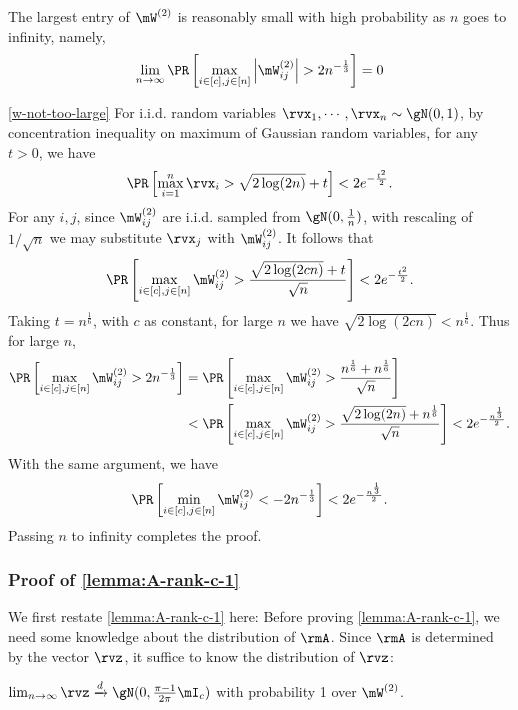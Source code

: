 \begin{lemma}
\label{w-not-too-large}
The largest entry of $\mW^{(2)}$ is reasonably small with high probability as $n$ goes to infinity, namely,
\begin{equation}
\lim_{n\to\infty}\PR\left[\max_{i\in[c],j\in[n]}\left|\mW^{(2)}_{ij}\right\vert > 2n^{-\frac13}\right] = 0
\end{equation}
\end{lemma}

\begin{proofof}{\cref{w-not-too-large}}
For i.i.d. random variables $\rvx_1,\cdots, \rvx_n\sim \gN(0,1)$,
by concentration inequality on maximum of Gaussian random variables, for any $t>0$, we have
\begin{equation}
    \PR\left[\max_{i=1}^n\rvx_i > \sqrt{2\log (2n)} + t\right] < 2e^{-\frac{t^2}{2}}.
\end{equation}
For any $i,j$, since $\mW^{(2)}_{ij}$ are i.i.d. sampled from $\gN(0,\frac1n)$, with rescaling of $1/\sqrt{n}$ we may substitute $\rvx_j$ with $\mW^{(2)}_{ij}$. It follows that
\begin{equation}
    \PR\left[\max_{i\in[c],j\in[n]}\mW^{(2)}_{ij} > \frac{\sqrt{2\log (2cn)} + t}{\sqrt{n}}\right] < 2e^{-\frac{t^2}{2}}.
\end{equation}
Taking $t=n^{\frac16}$, with $c$ as constant, for large $n$ we have $\sqrt{2\log (2cn)} < n^{\frac16}$. Thus for large $n$,
\begin{equation}
\begin{split}
    \PR\left[\max_{i\in[c],j\in[n]}\mW^{(2)}_{ij} > 2n^{-\frac13}\right] &= \PR\left[\max_{i\in[c],j\in[n]}\mW^{(2)}_{ij} > \frac{n^{\frac16} + n^{\frac16}}{\sqrt{n}}\right]\\
    & < \PR\left[\max_{i\in[c],j\in[n]}\mW^{(2)}_{ij} > \frac{\sqrt{2\log (2n)} + n^{\frac16}}{\sqrt{n}}\right] < 2e^{-\frac{n^{\frac13}}{2}}.
\end{split}
\end{equation}
With the same argument, we have
\begin{equation}
    \PR\left[\min_{i\in[c],j\in[n]}\mW^{(2)}_{ij} < -2n^{-\frac13}\right] < 2e^{-\frac{n^{\frac13}}{2}}.
\end{equation}
Passing $n$ to infinity completes the proof.
\end{proofof}

\subsubsection{Proof of \cref{lemma:A-rank-c-1}}
\label{proof-a-rank-c-1}
We first restate \cref{lemma:A-rank-c-1} here:
\lemmaArankc*
Before proving \cref{lemma:A-rank-c-1}, we need some knowledge about the distribution of $\rmA$. Since $\rmA$ is determined by the vector $\rvz$, it suffice to know the distribution of $\rvz$:
\begin{lemma}
\label{z-gaussian}
$\lim_{n\to\infty}\rvz\xrightarrow{d} \gN(0, \frac{\pi-1}{2\pi}\mI_c)$ with probability 1 over $\mW^{(2)}$.
\end{lemma}

